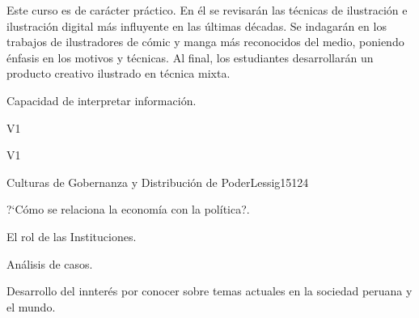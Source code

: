 \begin{syllabus}


\begin{justification}
Este curso es de carácter práctico. En él se revisarán las técnicas de ilustración e ilustración digital más influyente en las últimas décadas. Se indagarán en los trabajos de ilustradores de cómic y manga más reconocidos del medio, poniendo énfasis en los motivos y técnicas.  Al final, los estudiantes desarrollarán un producto creativo ilustrado en técnica mixta.

\end{justification}

\begin{goals}
\item Capacidad de interpretar información.
\end{goals}

\begin{outcomes}{V1}
    \item {}
    \item {}
    \item {}
    
\end{outcomes}

\begin{competences}{V1}
    \item {}
    \item {}
    \item {}
    \item {}
\end{competences}

\begin{unit}{Culturas de Gobernanza y Distribución de Poder}{}{Lessig15}{12}{4}
   \begin{topics}
      \item ?`Cómo se relaciona la economía con la política?.
      \item El rol de las Instituciones.
      \item Análisis de casos.
   \end{topics}
   \begin{learningoutcomes}
      \item Desarrollo del innterés por conocer sobre temas actuales en la sociedad peruana y el mundo.
   \end{learningoutcomes}
\end{unit}

\begin{coursebibliography}
\end{coursebibliography}

\end{syllabus}
